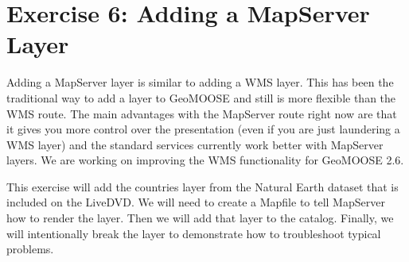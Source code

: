 \documentclass[letterpaper]{article}
\begin{document}
\section*{Exercise 6: Adding a MapServer Layer}
Adding a MapServer layer is similar to adding a WMS layer.  This has
been the traditional way to add a layer to GeoMOOSE and still is more
flexible than the WMS route.  The main advantages with the MapServer
route right now are that it gives you more control over the
presentation (even if you are just laundering a WMS layer) and the
standard services currently work better with MapServer layers. We are
working on improving the WMS functionality for GeoMOOSE 2.6.

This exercise will add the countries layer from the Natural Earth
dataset that is included on the LiveDVD.  We will need to create a
Mapfile to tell MapServer how to render the layer.  Then we will add
that layer to the catalog.  Finally, we will intentionally break the
layer to demonstrate how to troubleshoot typical problems.
\end{document}
